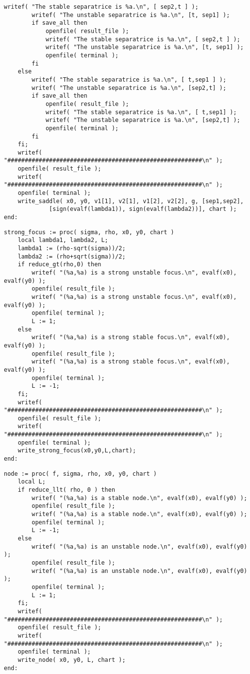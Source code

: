 \documentclass[a4paper,10pt]{article}
\begin{document}
\begin{lstlisting}[name=type]
        writef( "The stable separatrice is %a.\n", [ sep2,t ] );
        writef( "The unstable separatrice is %a.\n", [t, sep1] );
        if save_all then
            openfile( result_file );
            writef( "The stable separatrice is %a.\n", [ sep2,t ] );
            writef( "The unstable separatrice is %a.\n", [t, sep1] );
            openfile( terminal );
        fi
    else
        writef( "The stable separatrice is %a.\n", [ t,sep1 ] );
        writef( "The unstable separatrice is %a.\n", [sep2,t] );
        if save_all then
            openfile( result_file );
            writef( "The stable separatrice is %a.\n", [ t,sep1] );
            writef( "The unstable separatrice is %a.\n", [sep2,t] );
            openfile( terminal );
        fi
    fi;
    writef( "########################################################\n" );
    openfile( result_file );
    writef( "########################################################\n" );
    openfile( terminal );
    write_saddle( x0, y0, v1[1], v2[1], v1[2], v2[2], g, [sep1,sep2],
             [sign(evalf(lambda1)), sign(evalf(lambda2))], chart );
end:
\end{lstlisting}

\begin{lstlisting}[name=type]
strong_focus := proc( sigma, rho, x0, y0, chart )
    local lambda1, lambda2, L;
    lambda1 := (rho-sqrt(sigma))/2;
    lambda2 := (rho+sqrt(sigma))/2;
    if reduce_gt(rho,0) then
        writef( "(%a,%a) is a strong unstable focus.\n", evalf(x0), evalf(y0) );
        openfile( result_file );
        writef( "(%a,%a) is a strong unstable focus.\n", evalf(x0), evalf(y0) );
        openfile( terminal );
        L := 1;
    else
        writef( "(%a,%a) is a strong stable focus.\n", evalf(x0), evalf(y0) );
        openfile( result_file );
        writef( "(%a,%a) is a strong stable focus.\n", evalf(x0), evalf(y0) );
        openfile( terminal );
        L := -1;
    fi;
    writef( "########################################################\n" );
    openfile( result_file );
    writef( "########################################################\n" );
    openfile( terminal );
    write_strong_focus(x0,y0,L,chart);
end:
\end{lstlisting}

\begin{lstlisting}[name=type]
node := proc( f, sigma, rho, x0, y0, chart )
    local L;
    if reduce_llt( rho, 0 ) then
        writef( "(%a,%a) is a stable node.\n", evalf(x0), evalf(y0) );
        openfile( result_file );
        writef( "(%a,%a) is a stable node.\n", evalf(x0), evalf(y0) );
        openfile( terminal );
        L := -1;
    else
        writef( "(%a,%a) is an unstable node.\n", evalf(x0), evalf(y0) );
        openfile( result_file );
        writef( "(%a,%a) is an unstable node.\n", evalf(x0), evalf(y0) );
        openfile( terminal );
        L := 1;
    fi;
    writef( "########################################################\n" );
    openfile( result_file );
    writef( "########################################################\n" );
    openfile( terminal );
    write_node( x0, y0, L, chart );
end:
\end{lstlisting}
\end{document}
